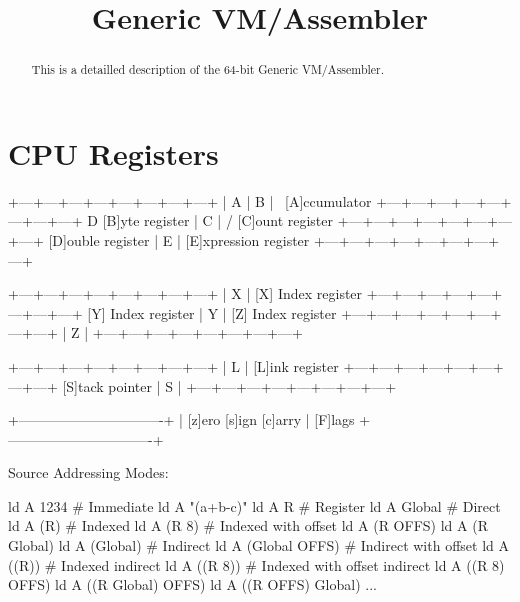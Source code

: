 \title{Generic VM/Assembler}

\maketitle

\begin{abstract}
  This is a detailled description of the 64-bit Generic VM/Assembler. 
\end{abstract}

\section{CPU Registers}
\label{sec:generic-vm-assembler-cpu-registers}


\begin{wideverbatim}

+---+---+---+---+---+---+---+---+
|               A           | B |  \      [A]ccumulator
+---+---+---+---+---+---+---+---+   D     [B]yte register
|               C               |  /      [C]ount register
+---+---+---+---+---+---+---+---+         [D]ouble register
|               E               |         [E]xpression register
+---+---+---+---+---+---+---+---+


+---+---+---+---+---+---+---+---+
|               X               |         [X] Index register
+---+---+---+---+---+---+---+---+         [Y] Index register
|               Y               |         [Z] Index register
+---+---+---+---+---+---+---+---+
|               Z               |
+---+---+---+---+---+---+---+---+

\end{wideverbatim}

\begin{wideverbatim}

+---+---+---+---+---+---+---+---+
|               L               |         [L]ink register
+---+---+---+---+---+---+---+---+         [S]tack pointer
|               S               |
+---+---+---+---+---+---+---+---+


+-------------------------------+
|  [z]ero    [s]ign    [c]arry  |         [F]lags
+-------------------------------+

\end{wideverbatim}

Source Addressing Modes:

\begin{wideverbatim}
ld A 1234            # Immediate
ld A "(a+b-c)"
ld A R               # Register
ld A Global          # Direct
ld A (R)             # Indexed
ld A (R 8)           # Indexed with offset
ld A (R OFFS)
ld A (R Global)
ld A (Global)        # Indirect
ld A (Global OFFS)   # Indirect with offset
ld A ((R))           # Indexed indirect
ld A ((R 8))         # Indexed with offset indirect
ld A ((R 8) OFFS)
ld A ((R Global) OFFS)
ld A ((R OFFS) Global)
...
\end{wideverbatim}

